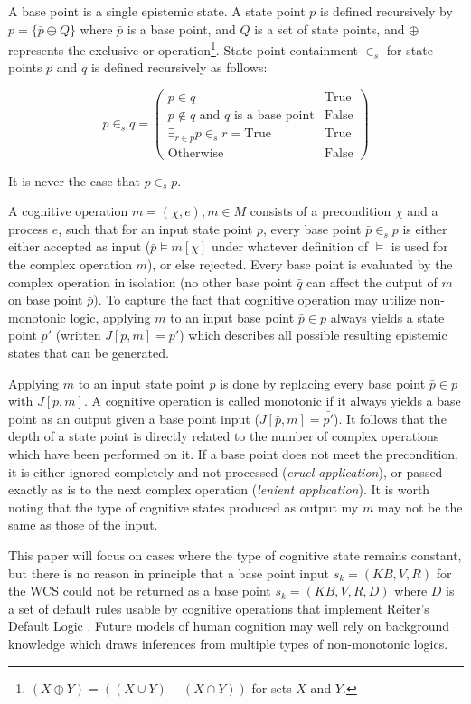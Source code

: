 \documentclass{article}
\begin{document}
A base point is a single epistemic state. A state point $p$ is defined recursively by $p=\{\bar{p} \oplus Q \}$ where $\bar{p}$ is a base point, and $Q$ is a set of state points, and $\oplus$ represents the exclusive-or operation\footnote{$(X \oplus Y) = ((X \cup Y) - (X \cap Y))$ for sets $X$ and $Y$.}. State point containment $\in_s$ for state points $p$ and $q$ is defined recursively as follows:

\[
p \in_s q = \begin{pmatrix} p \in q  & \textrm{True} \\ p \not\in q \textrm{ and } q \textrm{ is a base point} & \textrm{False}  \\  \exists_{r\in p}p \in_s r = \textrm{True} & \textrm{True}   \\ \textrm{Otherwise} & \textrm{False} \end{pmatrix}
\]

It is never the case that $p \in_s p$.

A cognitive operation $m = (\chi, e), m \in M$ consists of a precondition $\chi$ and a process $e$, such that for an input state point $p$, every base point $\bar{p} \in_s p$ is either either accepted as input ($\bar{p} \models m[\chi]$ under whatever definition of $\models$ is used for the complex operation $m$), or else rejected. Every base point is evaluated by the complex operation in isolation (no other base point $\bar{q}$ can affect the output of $m$ on base point $\bar{p}$). To capture the fact that cognitive operation may utilize non-monotonic logic, applying $m$ to an input base point $\bar{p}\in p$ always yields a state point $p'$ (written $J[\bar{p},m]=p'$) which describes all possible resulting epistemic states that can be generated. 

Applying $m$ to an input state point $p$ is done by replacing every base point $\bar{p} \in p$ with $J[\bar{p},m]$. A cognitive operation is called monotonic if it always yields a base point as an output given a base point input ($J[\bar{p},m]=\bar{p'}$). It follows that the depth of a state point is directly related to the number of complex operations which have been performed on it. If a base point does not meet the precondition, it is either ignored completely and not processed (\textit{cruel application}), or passed exactly as is to the next complex operation (\textit{lenient application}). It is worth noting that the type of cognitive states produced as output my $m$ may not be the same as those of the input.

This paper will focus on cases where the type of cognitive state remains constant, but there is no reason in principle that a base point input $s_k = (KB,V,R)$ for the WCS could not be returned as a base point $s_k = (KB,V,R,D)$ where $D$ is a set of default rules usable by cognitive operations that implement Reiter's Default Logic \citep{reiter1980logic}. Future models of human cognition may well rely on background knowledge which draws inferences from multiple types of non-monotonic logics.
\end{document}
